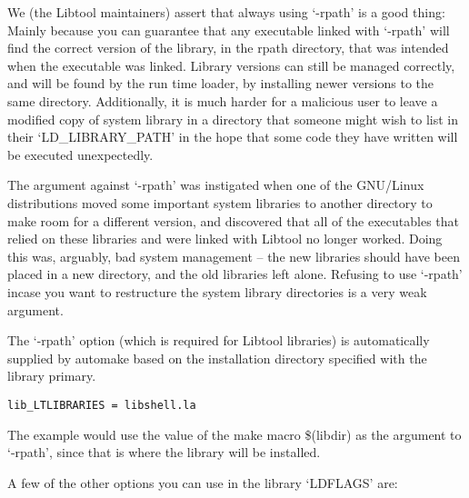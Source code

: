 We (the Libtool maintainers) assert that always using `-rpath' is a good thing: Mainly because you can guarantee that any executable linked with `-rpath' will find the correct version of the library, in the rpath directory, that was intended when the executable was linked. Library versions can still be managed correctly, and will be found by the run time loader, by installing newer versions to the same directory. Additionally, it is much harder for a malicious user to leave a modified copy of system library in a directory that someone might wish to list in their `LD\_{}LIBRARY\_{}PATH' in the hope that some code they have written will be executed unexpectedly. 


The argument against `-rpath' was instigated when one of the GNU/Linux distributions moved some important system libraries to another directory to make room for a different version, and discovered that all of the executables that relied on these libraries and were linked with Libtool no longer worked. Doing this was, arguably, bad system management -- the new libraries should have been placed in a new directory, and the old libraries left alone. Refusing to use `-rpath' incase you want to restructure the system library directories is a very weak argument. 


The `-rpath' option (which is required for Libtool libraries) is automatically supplied by automake based on the installation directory specified with the library primary.  


\begin{Verbatim}[frame=single]
lib_LTLIBRARIES = libshell.la
\end{Verbatim}

The example would use the value of the make macro \$(libdir) as the argument 
to `-rpath', since that is where the library will be installed. 


A few of the other options you can use in the library `LDFLAGS' are: 

